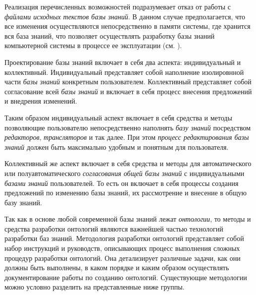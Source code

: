 Реализация перечисленных возможностей подразумевает отказ от работы с \textit{файлами исходных текстов базы знаний}. В данном случае предполагается, что все изменения осуществляются непосредственно в памяти системы, где хранится вся база знаний, что позволяет осуществлять разработку базы знаний компьютерной системы в процессе ее эксплуатации (см. ).


Проектирование базы знаний включает в себя два аспекта: индивидуальный и коллективный.
Индивидуальный представляет собой наполнение изолировнной части \textit{базы знаний} конкретным пользователем.
Коллективный представляет собой согласование всей \textit{базы знаний} и включает в себя процесс внесения предложений и внедрения изменений.

Таким образом индивидуальный аспект включает в себя средства и методы позволяющие пользователю непосредственно наполнять \textit{базу знаний} посредством \textit{редакторов}, \textit{трансляторов} и так далее. При этом \textit{процесс редактирования базы знаний} должен быть максимально удобным и понятным для пользователя.

Коллективный же аспект включает в себя средства и методы для автоматического или полуавтоматического \textit{согласования общей базы знаний} с индивидуальными \textit{базами знаний} пользователей. То есть он включает в себя процессы создания предложений по изменению базы знаний, их рассмотрение и внесение в общую базу знаний.

Так как в основе любой современной базы знаний лежат \textit{онтологии}, то методы и средства разработки онтологий являются важнейшей частью технологий разработки баз знаний.
Методология разработки онтологий представляет собой набор инструкций и руководств, описывающих процесс выполнения сложных процедур разработки онтологий.
Она детализирует различные задачи, как они должны быть выполнены, в каком порядке и каким образом осуществлять документирование работы по созданию онтологий.
Существующие методологии можно условно разделить на представленные ниже группы.

